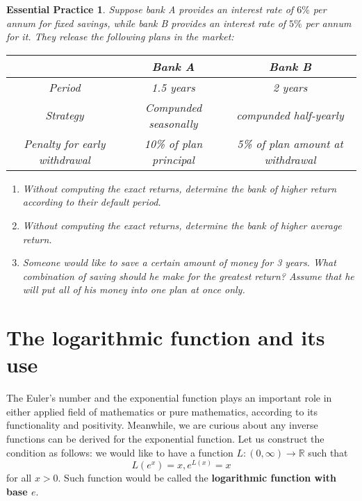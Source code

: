 \documentclass[12pt]{article}
\newtheorem{exercise}{Essential Practice}[section]
\begin{document}
    \begin{exercise}
        Suppose bank A provides an interest rate of $6\%$ per annum for fixed savings, while bank B provides an interest rate of $5\%$ per annum for it. They release the following plans in the market:
        \begin{center}
            \begin{tabular}{|c|c|c|}
                \hline
                &Bank A&Bank B\\
                \hline
                Period&1.5 years&2 years\\
                \hline
                Strategy&Compunded seasonally&compunded half-yearly\\
                \hline
                Penalty for early withdrawal&10\% of plan principal&5\% of plan amount at withdrawal\\
                \hline
            \end{tabular}
        \end{center}
        \begin{enumerate}
            \item Without computing the exact returns, determine the bank of higher return according to their default period.
            \item Without computing the exact returns, determine the bank of higher average return.
            \item Someone would like to save a certain amount of money for 3 years. What combination of saving should he make for the greatest return? Assume that he will put all of his money into one plan at once only.
        \end{enumerate}
    \end{exercise}

    \section{The logarithmic function and its use}

    The Euler's number and the exponential function plays an important role in either applied field of mathematics or pure mathematics, according to its functionality and positivity. Meanwhile, we are curious about any inverse functions can be derived for the exponential function. Let us construct the condition as follows: we would like to have a function $L:(0,\infty)\to \mathbb{R}$ such that \[L(e^x)=x, e^{L(x)}=x\] for all $x>0$. Such function would be called the \textbf{logarithmic function with base $e$}.
\end{document}
